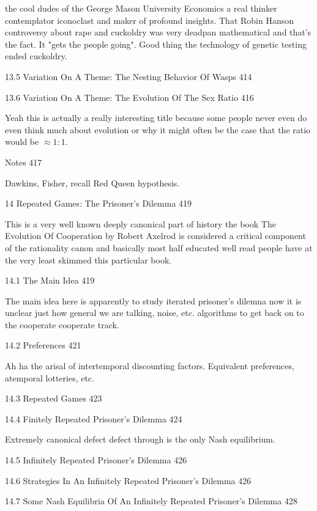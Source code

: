 the cool dudes of the George Mason University Economics a real thinker contemplator iconoclast and maker of profound insights. That Robin Hanson controversy about rape and cuckoldry was very deadpan mathematical and that's the fact. It "gets the people going". Good thing the technology of genetic testing ended cuckoldry.

13.5 Variation On A Theme: The Nesting Behavior Of Wasps 414



13.6 Variation On A Theme: The Evolution Of The Sex Ratio 416

Yeah this is actually a really interesting title because some people never even do even think much about evolution or why it might often be the case that the ratio would be $\approx 1:1$.

Notes 417

Dawkins, Fisher, recall Red Queen hypothesis.

14 Repeated Games: The Prisoner's Dilemma 419

This is a very well known deeply canonical part of history the book The Evolution Of Cooperation by Robert Axelrod is considered a critical component of the rationality canon and basically most half educated well read people have at the very least skimmed this particular book.

14.1 The Main Idea 419

The main idea here is apparently to study iterated prisoner's dilemna now it is unclear just how general we are talking, noise, etc. algorithms to get back on to the cooperate cooperate track.

14.2 Preferences 421

Ah ha the arisal of intertemporal discounting factors. Equivalent preferences, atemporal lotteries, etc.

14.3 Repeated Games 423



14.4 Finitely Repeated Prisoner's Dilemma 424

Extremely canonical defect defect through is the only Nash equilibrium.

14.5 Infinitely Repeated Prisoner's Dilemma 426



14.6 Strategies In An Infinitely Repeated Prisoner's Dilemma 426



14.7 Some Nash Equilibria Of An Infinitely Repeated Prisoner's Dilemma 428



